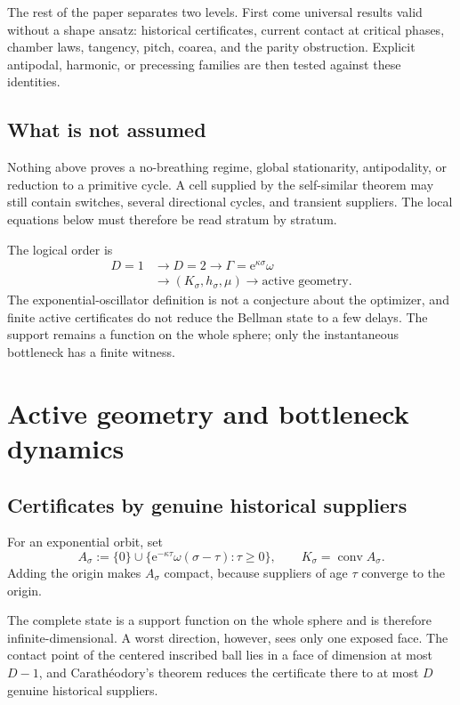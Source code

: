 \documentclass[10pt,a4paper]{article}
\newcommand{\conv}{\operatorname{conv}}
\newcommand{\e}{\mathrm{e}}
\theoremstyle{plain}
\theoremstyle{definition}
\theoremstyle{remark}
\begin{document}
The rest of the paper separates two levels. First come universal results valid without a shape ansatz: historical certificates, current contact at critical phases, chamber laws, tangency, pitch, coarea, and the parity obstruction. Explicit antipodal, harmonic, or precessing families are then tested against these identities.

\subsection{What is not assumed}

Nothing above proves a no-breathing regime, global stationarity, antipodality, or reduction to a primitive cycle. A cell supplied by the self-similar theorem may still contain switches, several directional cycles, and transient suppliers. The local equations below must therefore be read stratum by stratum.

The logical order is
\[
\begin{aligned}
  D=1&\longrightarrow D=2
  \longrightarrow \Gamma=\e^{\kappa\sigma}\omega\\
  &\longrightarrow (K_\sigma,h_\sigma,\mu)
  \longrightarrow \text{active geometry}.
\end{aligned}
\]
The exponential-oscillator definition is not a conjecture about the optimizer, and finite active certificates do not reduce the Bellman state to a few delays. The support remains a function on the whole sphere; only the instantaneous bottleneck has a finite witness.

\section{Active geometry and bottleneck dynamics}
\label{sec:active-geometry}

\subsection{Certificates by genuine historical suppliers}

For an exponential orbit, set
\[
  A_\sigma:=\{0\}\cup\{\e^{-\kappa\tau}\omega(\sigma-\tau):\tau\ge0\},
  \qquad
  K_\sigma=\conv A_\sigma.
\]
Adding the origin makes $A_\sigma$ compact, because suppliers of age $\tau$ converge to the origin.

The complete state is a support function on the whole sphere and is therefore infinite-dimensional. A worst direction, however, sees only one exposed face. The contact point of the centered inscribed ball lies in a face of dimension at most $D-1$, and Carathéodory's theorem reduces the certificate there to at most $D$ genuine historical suppliers.
\end{document}
